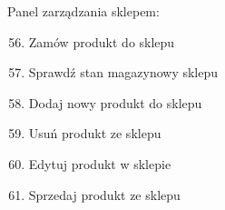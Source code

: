 {Panel zarządzania sklepem:}

\begin{enumerate}
\setcounter{enumi}{55}
\tightlist
\item
{Zamów produkt do sklepu}
\item
{Sprawdź stan magazynowy sklepu}
\item
{Dodaj nowy produkt do sklepu}
\item
{Usuń produkt ze sklepu}
\item
{Edytuj produkt w sklepie}
\item
{Sprzedaj produkt ze sklepu}
\end{enumerate}
